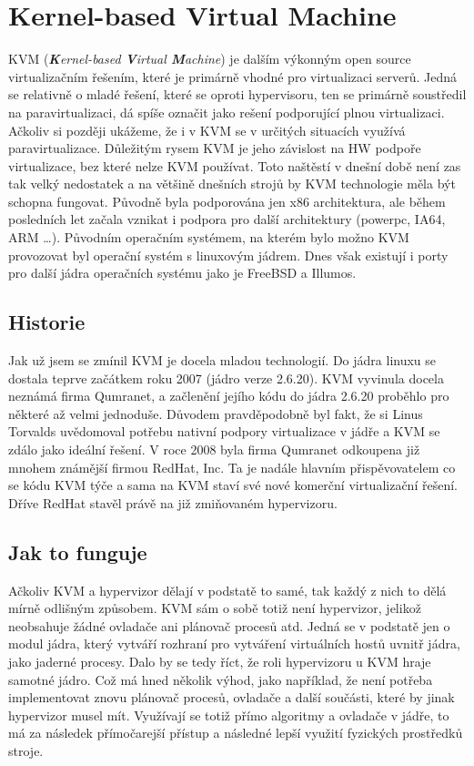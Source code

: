 \section{Kernel-based Virtual Machine}
KVM (\emph{\textbf{K}ernel-based \textbf{V}irtual \textbf{M}achine}) je dalším výkonným open source virtualizačním řešením, které je primárně vhodné pro virtualizaci serverů. Jedná se relativně o mladé řešení, které se oproti \xen hypervisoru, ten se primárně soustředil na paravirtualizaci, dá spíše označit jako rešení podporující plnou virtualizaci. Ačkoliv si později ukážeme, že i v KVM se v určitých situacích využívá paravirtualizace. Důležitým rysem KVM je jeho závislost na HW podpoře virtualizace, bez které nelze KVM používat. Toto naštěstí v dnešní době není zas tak velký nedostatek a na většině dnešních strojů by KVM technologie měla být schopna fungovat. Původně byla podporována jen x86 architektura, ale během posledních let začala vznikat i podpora pro další architektury (powerpc, IA64, ARM \dots). Původním operačním systémem, na kterém bylo možno KVM provozovat byl operační systém s linuxovým jádrem. Dnes však existují i porty pro další jádra operačních systému jako je FreeBSD a Illumos.

\subsection{Historie}
Jak už jsem se zmínil KVM je docela mladou technologií. Do jádra linuxu se dostala teprve začátkem roku 2007 (jádro verze 2.6.20). KVM vyvinula docela neznámá firma Qumranet, a začlenění jejího kódu do jádra 2.6.20 proběhlo pro některé až velmi jednoduše. Důvodem pravděpodobně byl fakt, že si Linus Torvalds uvědomoval potřebu nativní podpory virtualizace v jádře a KVM se zdálo jako ideální řešení. V roce 2008 byla firma Qumranet odkoupena již mnohem známější firmou RedHat, Inc. Ta je nadále hlavním přispěvovatelem co se kódu KVM týče a sama na KVM staví své nové komerční virtualizační řešení. Dříve RedHat stavěl právě na již zmiňovaném \xen hypervizoru. 

\subsection{Jak to funguje}
Ačkoliv KVM a \xen hypervizor dělají v podstatě to samé, tak každý z nich to dělá mírně odlišným způsobem. KVM sám o sobě totiž není hypervizor, jelikož neobsahuje žádné ovladače ani plánovač procesů atd. Jedná se v podstatě jen o modul jádra, který vytváří rozhraní pro vytváření virtuálních hostů uvnitř jádra, jako jaderné procesy. Dalo by se tedy říct, že roli hypervizoru u KVM hraje samotné jádro. Což má hned několik výhod, jako například, že není potřeba implementovat znovu plánovač procesů, ovladače a další součásti, které by jinak hypervizor musel mít. Využívají se totiž přímo algoritmy a ovladače v jádře, to má za následek přímočarejší přístup a následné lepší využití fyzických prostředků stroje.

